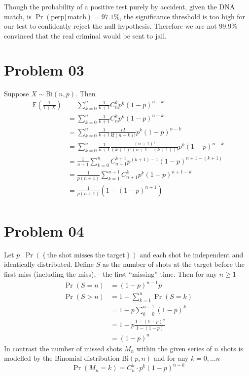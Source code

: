 \documentclass[a4paper]{article}
\newcommand{\obj}[1]{\left\{ #1 \right \}}
\newcommand{\brac}[1]{\left ( #1 \right )}
\newcommand{\induc}[1]{\left . #1 \right \vert}
\newcommand{\defn}{\mathop{\overset{\Delta}{=}}\nolimits}
\begin{document}
Though the probability of a positive test purely by accident, given the DNA match, is $\Pr\brac{\induc{\text{perp}}\,\text{match}}=97.1\%$, the significance threshold is too high for our test to confidently reject the null hypothesis. Therefore we are not 99.9\% convinced that the real criminal would be sent to jail.


\section{Problem 03} %
\label{sec:problem_03}

Suppose $X\sim \text{Bi}\brac{n, p}$. Then \begin{align*}
\mathbb{E}\brac{\frac{1}{1+X}}&=\sum_{k=0}^n \frac{1}{k+1} C^k_n p^k\brac{1-p}^{n-k}\\&=\sum_{k=0}^n \frac{1}{k+1} C^k_n p^k\brac{1-p}^{n-k}\\&=\sum_{k=0}^n \frac{1}{k+1} \frac{n!}{k!\brac{n-k}!} p^k\brac{1-p}^{n-k}\\&=\sum_{k=0}^n \frac{1}{n+1} \frac{\brac{n+1}!}{\brac{k+1}!\brac{n+1-(k+1)}!} p^k\brac{1-p}^{n-k}\\&=\frac{1}{n+1}\sum_{k=0}^n C^{k+1}_{n+1} p^{(k+1)-1}\brac{1-p}^{n+1-(k+1)}\\&=\frac{1}{p\brac{n+1}}\sum_{k=1}^{n+1} C^k_{n+1} p^k\brac{1-p}^{n+1-k}\\&=\frac{1}{p\brac{n+1}}\brac{1 - \brac{1-p}^{n+1}}\\
\end{align*}


\section{Problem 04} %
\label{sec:problem_04}

Let $p\defn \Pr\brac{\obj{\text{the shot misses the target}}}$ and each shot be independent and identically distributed. Define $S$ as the number of shots at the target before the first miss (including the miss), - the first ``missing'' time. Then for any $n\geq1$ \begin{align*}
\Pr\brac{S=n} &= \brac{1-p}^{n-1} p\\
\Pr\brac{S > n} &= 1-\sum_{k=1}^n \Pr\brac{S=k}\\ &= 1-p \sum_{k=0}^{n-1} \brac{1-p}^k\\ &= 1 - p\frac{1-\brac{1-p}^n}{1-\brac{1-p}}\\&=\brac{1-p}^n
\end{align*} In contrast the number of missed shots $M_n$ within the given series of $n$ shots is modelled by the Binomial distribution $\text{Bi}\brac{p,n}$ and for any $k=0,\ldots n$ \[\Pr\brac{M_n=k} = C^k_n \cdot p^k \brac{1-p}^{n-k}\]
\end{document}
